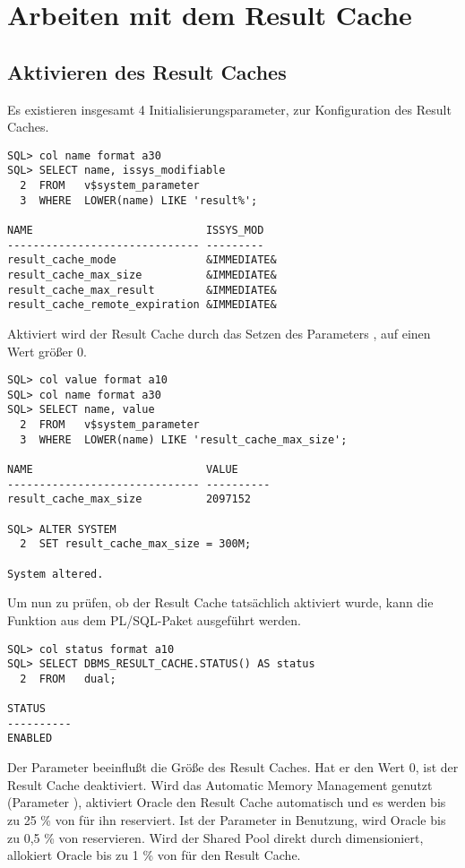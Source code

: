     \section{Arbeiten mit dem Result Cache}
      \subsection{Aktivieren des Result Caches}
        Es existieren insgesamt 4 Initialisierungsparameter, zur
        Konfiguration des Result Caches.
        \begin{lstlisting}[caption={Die Result Cache Parameter},label=admin700,language=oracle_sql,alsolanguage=sqlplus]
SQL> col name format a30 
SQL> SELECT name, issys_modifiable
  2  FROM   v$system_parameter
  3  WHERE  LOWER(name) LIKE 'result%';

NAME                           ISSYS_MOD
------------------------------ ---------
result_cache_mode              &IMMEDIATE&
result_cache_max_size          &IMMEDIATE&
result_cache_max_result        &IMMEDIATE&
result_cache_remote_expiration &IMMEDIATE&
        \end{lstlisting}
        Aktiviert wird der Result Cache durch das Setzen des Parameters , auf einen Wert größer 0.
        \begin{lstlisting}[caption={Den Result Cache aktivieren},label=admin701,language=oracle_sql,alsolanguage=sqlplus]
SQL> col value format a10
SQL> col name format a30
SQL> SELECT name, value
  2  FROM   v$system_parameter
  3  WHERE  LOWER(name) LIKE 'result_cache_max_size';

NAME                           VALUE
------------------------------ ----------
result_cache_max_size          2097152

SQL> ALTER SYSTEM
  2  SET result_cache_max_size = 300M;

System altered.
        \end{lstlisting}
        Um nun zu prüfen, ob der Result Cache tatsächlich aktiviert wurde, kann die Funktion  aus dem PL/SQL-Paket  ausgeführt werden.

        \begin{lstlisting}[caption={Welchen Status hat der Result Cache?},label=admin702,language=oracle_sql,alsolanguage=sqlplus]
SQL> col status format a10
SQL> SELECT DBMS_RESULT_CACHE.STATUS() AS status
  2  FROM   dual;

STATUS
----------
ENABLED
        \end{lstlisting}
        Der  Parameter beeinflußt die Größe des Result Caches. Hat er den Wert 0, ist der Result Cache deaktiviert. Wird das Automatic Memory Management genutzt (Parameter ), aktiviert Oracle den Result Cache automatisch und es werden bis zu 25 \% von  für ihn reserviert. Ist der Parameter  in Benutzung, wird Oracle bis zu 0,5 \% von  reservieren. Wird der Shared Pool direkt durch  dimensioniert, allokiert Oracle bis zu 1 \% von  für den Result Cache.

